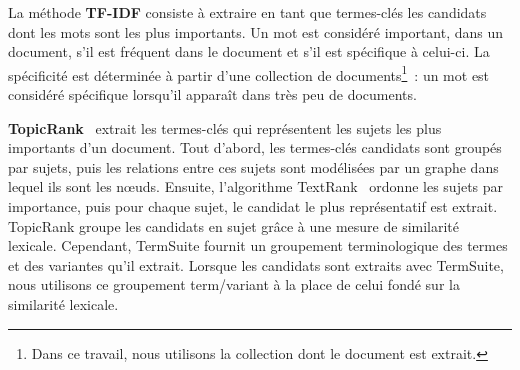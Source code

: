     La méthode \textbf{TF-IDF} consiste à extraire en tant que termes-clés les
    candidats dont les mots sont les plus importants. Un mot est considéré
    important, dans un document, s'il est fréquent dans le document et s'il est
    spécifique à celui-ci. La spécificité est déterminée à partir d'une
    collection de documents\footnote{Dans ce travail, nous utilisons la
    collection dont le document est extrait.}~: un mot est considéré spécifique
    lorsqu'il apparaît dans très peu de documents.

    \textbf{TopicRank}~\cite{bougouin2013topicrank} extrait les termes-clés qui
    représentent les sujets les plus importants d'un document. Tout d'abord, les
    termes-clés candidats sont groupés par sujets, puis les relations entre ces
    sujets sont modélisées par un graphe dans lequel ils sont les n\oe{}uds.
    Ensuite, l'algorithme TextRank~\cite{mihalcea2004textrank} ordonne les
    sujets par importance, puis pour chaque sujet, le candidat le plus
    représentatif est extrait. TopicRank groupe les candidats en sujet grâce à
    une mesure de similarité lexicale. Cependant, TermSuite fournit un
    groupement terminologique des termes et des variantes qu'il extrait. Lorsque
    les candidats sont extraits avec TermSuite, nous utilisons ce groupement
    term/variant à la place de celui fondé sur la similarité lexicale.

